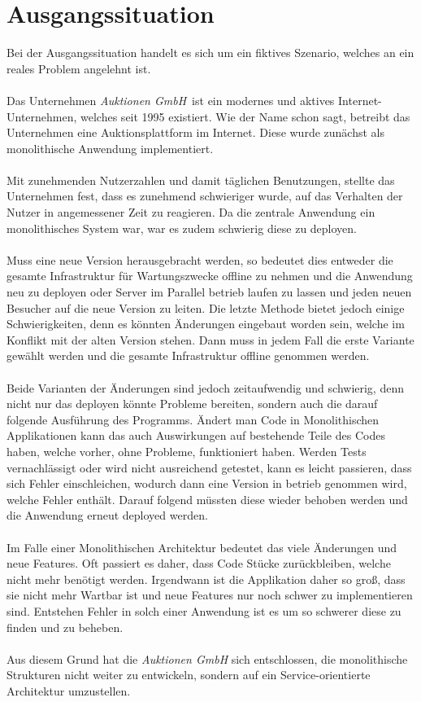 \section{Ausgangssituation}
\label{sec:ausgangssituation}
Bei der Ausgangssituation handelt es sich um ein fiktives Szenario, welches an ein reales Problem
angelehnt ist.
\\\\
Das Unternehmen \textit{Auktionen GmbH}\ ist ein modernes und aktives Internet-Unternehmen, welches seit 1995 existiert. Wie der Name schon sagt, betreibt das Unternehmen eine Auktionsplattform im Internet. Diese wurde zunächst als monolithische Anwendung implementiert.
\\\\
Mit zunehmenden Nutzerzahlen und damit täglichen Benutzungen, stellte das Unternehmen fest, dass es zunehmend schwieriger wurde, auf das Verhalten der Nutzer in angemessener Zeit zu reagieren. Da die zentrale Anwendung ein monolithisches System war, war es zudem schwierig diese zu deployen.
\\\\
Muss eine neue Version herausgebracht werden, so bedeutet dies entweder die gesamte Infrastruktur für Wartungszwecke offline zu nehmen und die Anwendung neu zu deployen oder Server im Parallel betrieb laufen zu lassen und jeden neuen Besucher auf die neue Version zu leiten. Die letzte Methode bietet jedoch einige Schwierigkeiten, denn es könnten Änderungen eingebaut worden sein, welche im Konflikt mit der alten Version stehen. Dann muss in jedem Fall die erste Variante gewählt werden und die gesamte Infrastruktur offline genommen werden.
\\\\
Beide Varianten der Änderungen sind jedoch zeitaufwendig und schwierig, denn nicht nur das deployen könnte Probleme bereiten, sondern auch die darauf folgende Ausführung des Programms. Ändert man Code in Monolithischen Applikationen kann das auch Auswirkungen auf bestehende Teile des Codes haben, welche vorher, ohne Probleme, funktioniert haben. Werden Tests vernachlässigt oder wird nicht ausreichend getestet, kann es leicht passieren, dass sich Fehler einschleichen, wodurch dann eine Version in betrieb genommen wird, welche Fehler enthält. Darauf folgend müssten diese wieder behoben werden und die Anwendung erneut deployed werden.
\\\\
Im Falle einer Monolithischen Architektur bedeutet das viele Änderungen und neue Features. Oft passiert es daher, dass Code Stücke zurückbleiben, welche nicht mehr benötigt werden. Irgendwann ist die Applikation daher so groß, dass sie nicht mehr Wartbar ist und neue Features nur noch schwer zu implementieren sind. Entstehen Fehler in solch einer Anwendung ist es um so schwerer diese zu finden und zu beheben.
\\\\
Aus diesem Grund hat die \textit{Auktionen GmbH} sich entschlossen, die monolithische Strukturen nicht weiter zu entwickeln, sondern auf ein Service-orientierte Architektur umzustellen.

